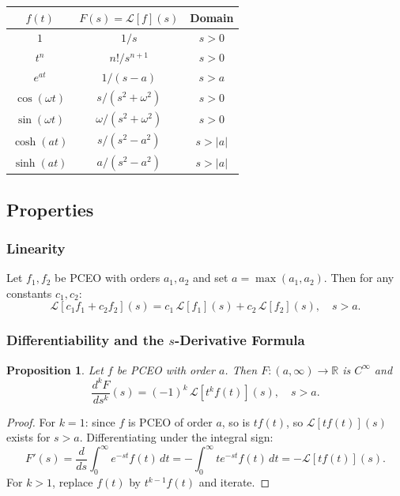 \documentclass{article}
\newtheorem{proposition}{Proposition}
\newcommand{\Lap}{\mathcal{L}}
\newcommand{\R}{\mathbb{R}}
\begin{document}
\renewcommand{\arraystretch}{1.6}
\begin{center}
\begin{tabular}{c|c|c}
    $f(t)$ & $F(s) = \Lap[f](s)$ & Domain \\\hline
    $1$ & $1/s$ & $s > 0$ \\
    $t^n$ & $n!/s^{n+1}$ & $s > 0$ \\
    $e^{at}$ & $1/(s-a)$ & $s > a$ \\
    $\cos(\omega t)$ & $s/(s^2+\omega^2)$ & $s > 0$ \\
    $\sin(\omega t)$ & $\omega/(s^2+\omega^2)$ & $s > 0$ \\
    $\cosh(at)$ & $s/(s^2-a^2)$ & $s > |a|$ \\
    $\sinh(at)$ & $a/(s^2-a^2)$ & $s > |a|$
\end{tabular}
\end{center}
\renewcommand{\arraystretch}{1}

\subsection{Properties}

\subsubsection{Linearity}

Let $f_1, f_2$ be PCEO with orders $a_1, a_2$ and set $a = \max(a_1, a_2)$. Then for any constants $c_1, c_2$:
\[\Lap[c_1 f_1 + c_2 f_2](s) = c_1\,\Lap[f_1](s) + c_2\,\Lap[f_2](s),\quad s > a.\]

\subsubsection{Differentiability and the $s$-Derivative Formula}

\begin{proposition}
    Let $f$ be PCEO with order $a$. Then $F:(a,\infty)\to\R$ is $C^\infty$ and
    \[\frac{d^k F}{ds^k}(s) = (-1)^k\,\Lap[t^k f(t)](s),\quad s > a.\]
\end{proposition}

\begin{proof}
    For $k = 1$: since $f$ is PCEO of order $a$, so is $tf(t)$, so $\Lap[tf(t)](s)$ exists for $s > a$. Differentiating under the integral sign:
    \[F'(s) = \frac{d}{ds}\int_0^\infty e^{-st}f(t)\,dt = -\int_0^\infty te^{-st}f(t)\,dt = -\Lap[tf(t)](s).\]
    For $k > 1$, replace $f(t)$ by $t^{k-1}f(t)$ and iterate.
\end{proof}
\end{document}
